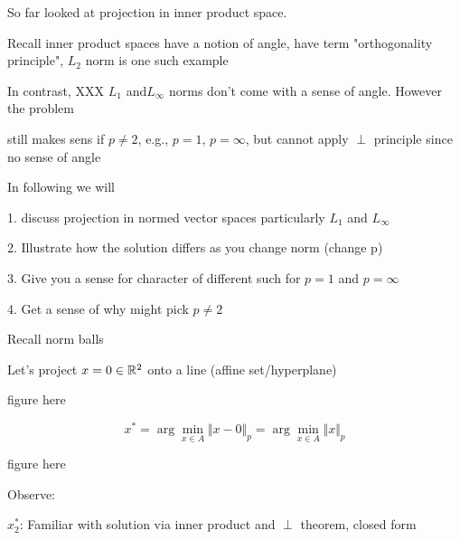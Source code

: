 So far looked at projection in inner product space.

Recall inner product spaces have a notion of angle, have term "orthogonality principle", $L_{2}$ norm is one such example

In contrast, XXX $L_{1}$ and$ L_{\infty}$ norms don't come with a sense of angle. However the problem



still makes sens if $p\neq 2$, e.g., $p=1$, $p=\infty$, but cannot apply $\perp$ principle since no sense of angle

In following we will

1. discuss projection in normed vector spaces particularly $L_{1}$ and $L_{\infty}$

2. Illustrate how the solution differs as you change norm (change p)

3. Give you a sense for character of different such for $p=1$ and $p=\infty$

4. Get a sense of why might pick $p\neq 2$


Recall norm balls

\begin{marginfigure}
	\centering
	\resizebox{7.5cm}{3cm}{}
	\caption{}
	\label{}
\end{marginfigure}

\begin{marginfigure}
	\centering
	\resizebox{7.5cm}{3cm}{}
	\caption{}
	\label{}
\end{marginfigure}

\begin{marginfigure}
	\centering
	\resizebox{7.5cm}{3cm}{}
	\caption{}
	\label{}
\end{marginfigure}

\begin{marginfigure}
	\centering
	\resizebox{7.5cm}{3cm}{}
	\caption{}
	\label{}
\end{marginfigure}

Let's project $x=0\in\mathbb{R}^{2}$ onto a line (affine set/hyperplane)

figure here

$$x^{*}=\arg\min_{x\in A} \Vert x-0\Vert_{p}=\arg\min_{x\in A} \Vert x\Vert_{p}$$


figure here

Observe:

$x_{2}^{*}$: Familiar with solution via inner product and $\perp$ theorem, closed form

